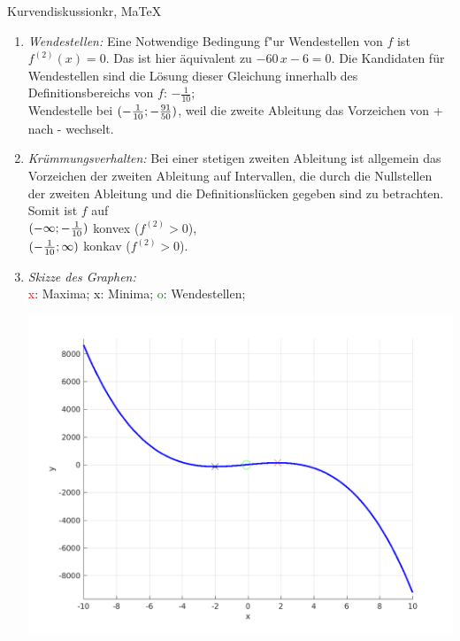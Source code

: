 \begin{MAufgabe}{Kurvendiskussion}{kr, MaTeX}
\begin{enumerate}
 $\MoIl-\infty\MIntvlSep-2\MoIr$ monoton fallend, \\ 
 $\MoIl-2\MIntvlSep\frac{9}{5}\MoIr$ monoton  wachsend, \\ 
 $\MoIl\frac{9}{5}\MIntvlSep \infty\MoIr$ monoton fallend. \\ 
 \item \emph{Wendestellen:} 
 Eine Notwendige Bedingung f"ur Wendestellen von $f$ ist $f^{(2)}(x)=0$. 
 Das ist hier \"aquivalent zu $ - 60\, x - 6=0$. 
 Die Kandidaten f\"ur Wendestellen sind die L\"osung dieser Gleichung innerhalb des Definitionsbereichs von $f$: $- \frac{1}{10}$; \\ 
 Wendestelle bei $(- \frac{1}{10};- \frac{91}{50})$, weil die zweite Ableitung das Vorzeichen von + nach - wechselt. \\ 
 \item \emph{Kr\"ummungsverhalten:} 
 Bei einer stetigen zweiten Ableitung ist allgemein das Vorzeichen der zweiten Ableitung auf Intervallen, die durch die Nullstellen der zweiten Ableitung und die Definitionsl\"ucken gegeben sind zu betrachten. 
 Somit ist $f$ auf \\ 
 $(-\infty ;- \frac{1}{10})$  konvex ($f^{(2)}>0$), \\ 
 $(- \frac{1}{10}; \infty)$  konkav ($f^{(2)}>0$). \\ 
 \item \emph{Skizze des Graphen:} \\ 
 {\textcolor{red} x}: Maxima; {\textcolor{black} x}: Minima; {\textcolor{green} o}: Wendestellen; 
  \begin{center}
  \includegraphics[width=0.8\linewidth]{Abb_zur_Ag_autogenerated_fractions_41.png} \end{center}
  
 \end{enumerate}
 \else\relax\fi
  \end{MAufgabe}